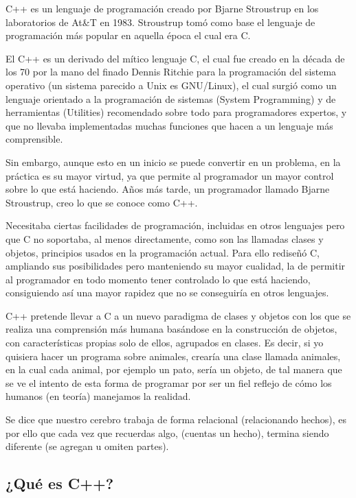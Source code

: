 C++ es un lenguaje de programación creado por Bjarne Stroustrup en los laboratorios de At\&T en 1983. Stroustrup tomó como base el lenguaje de programación más popular en aquella época el cual era C.

El C++ es un derivado del mítico lenguaje C, el cual fue creado en la década de los 70 por la mano del finado Dennis Ritchie para la programación del sistema operativo (un sistema parecido a Unix es GNU/Linux), el cual surgió como un lenguaje orientado a la programación de sistemas (System Programming) y de herramientas (Utilities) recomendado sobre todo para programadores expertos, y que no llevaba implementadas muchas funciones que hacen a un lenguaje más comprensible.

Sin embargo, aunque esto en un inicio se puede convertir en un problema, en la práctica es su mayor virtud, ya que permite al programador un mayor control sobre lo que está haciendo. Años más tarde, un programador llamado Bjarne Stroustrup, creo lo que se conoce como C++.

Necesitaba ciertas facilidades de programación, incluidas en otros lenguajes pero que C no soportaba, al menos directamente, como son las llamadas clases y objetos, principios usados en la programación actual. Para ello rediseñó C, ampliando sus posibilidades pero manteniendo su mayor cualidad, la de permitir al programador en todo momento tener controlado lo que está haciendo, consiguiendo así una mayor rapidez que no se conseguiría en otros lenguajes.

C++ pretende llevar a C a un nuevo paradigma de clases y objetos con los que se realiza una comprensión más humana basándose en la construcción de objetos, con características propias solo de ellos, agrupados en clases. Es decir, si yo quisiera hacer un programa sobre animales, crearía una clase llamada animales, en la cual cada animal, por ejemplo un pato, sería un objeto, de tal manera que se ve el intento de esta forma de programar por ser un fiel reflejo de cómo los humanos (en teoría) manejamos la realidad.

Se dice que nuestro cerebro trabaja de forma relacional (relacionando hechos), es por ello que cada vez que recuerdas algo, (cuentas un hecho), termina siendo diferente (se agregan u omiten partes).

\subsection{¿Qué es C++?}

